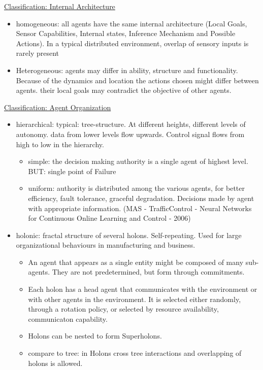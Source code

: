 \underline{Classification: Internal Architecture}
\begin{itemize}[noitemsep,nolistsep]
	\item homogeneous: all agents have the same internal architecture (Local Goals, Sensor Capabilities, Internal states, Inference Mechanism and Possible Actions). In a typical distributed environment, overlap of sensory inputs is rarely present
	\item Heterogeneous: agents may differ in ability, structure and functionality. Because of the dynamics and location the actions chosen might differ between agents. their local goals may contradict the objective of other agents.
\end{itemize}
\underline{Classification: Agent Organization}
\begin{itemize}[noitemsep,nolistsep]
	\item hierarchical: typical: tree-structure. At different heights, different levels of autonomy. data from lower levels flow upwards. Control signal flows from high to low in the hierarchy.
	\begin{itemize}[noitemsep,nolistsep]
		\item simple: the decision making authority is a single agent of highest level. BUT: single point of Failure
		\item uniform: authority is distributed among the various agents, for better efficiency, fault tolerance, graceful degradation. Decisions made by agent with appropriate information. (MAS - TrafficControl - Neural Networks for Continuous Online Learning and Control - 2006)
	\end{itemize}
	\item holonic: fractal structure of several holons. Self-repeating. Used for large organizational behaviours in manufacturing and business. 
	\begin{itemize}[noitemsep,nolistsep]
		\item An agent that appears as a single entity might be composed of many sub-agents. They are not predetermined, but form through commitments.
		\item Each holon has a head agent that communicates with the environment or with other agents in the environment. It is selected either randomly, through a rotation policy, or selected by resource availability, communicaton capability.
		\item Holons can be nested to form Superholons.
		\item compare to tree: in Holons cross tree interactions and overlapping of holons is allowed.

\end{itemize}
\end{itemize}
